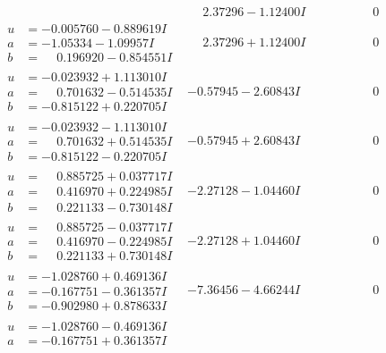 \documentclass[1p]{elsarticle_modified}
\theoremstyle{definition}
\begin{document}
$$\begin{array}{c|c|c}
 & \phantom{-}2.37296 - 1.12400 I & \phantom{-0.000000 } 0 \\ \hline\begin{aligned}
u &= -0.005760 - 0.889619 I \\
a &= -1.05334 - 1.09957 I \\
b &= \phantom{-}0.196920 - 0.854551 I\end{aligned}
 & \phantom{-}2.37296 + 1.12400 I & \phantom{-0.000000 } 0 \\ \hline\begin{aligned}
u &= -0.023932 + 1.113010 I \\
a &= \phantom{-}0.701632 - 0.514535 I \\
b &= -0.815122 + 0.220705 I\end{aligned}
 & -0.57945 - 2.60843 I & \phantom{-0.000000 } 0 \\ \hline\begin{aligned}
u &= -0.023932 - 1.113010 I \\
a &= \phantom{-}0.701632 + 0.514535 I \\
b &= -0.815122 - 0.220705 I\end{aligned}
 & -0.57945 + 2.60843 I & \phantom{-0.000000 } 0 \\ \hline\begin{aligned}
u &= \phantom{-}0.885725 + 0.037717 I \\
a &= \phantom{-}0.416970 + 0.224985 I \\
b &= \phantom{-}0.221133 - 0.730148 I\end{aligned}
 & -2.27128 - 1.04460 I & \phantom{-0.000000 } 0 \\ \hline\begin{aligned}
u &= \phantom{-}0.885725 - 0.037717 I \\
a &= \phantom{-}0.416970 - 0.224985 I \\
b &= \phantom{-}0.221133 + 0.730148 I\end{aligned}
 & -2.27128 + 1.04460 I & \phantom{-0.000000 } 0 \\ \hline\begin{aligned}
u &= -1.028760 + 0.469136 I \\
a &= -0.167751 - 0.361357 I \\
b &= -0.902980 + 0.878633 I\end{aligned}
 & -7.36456 - 4.66244 I & \phantom{-0.000000 } 0 \\ \hline\begin{aligned}
u &= -1.028760 - 0.469136 I \\
a &= -0.167751 + 0.361357 I \\

\end{aligned}
\end{array}$$
\end{document}
